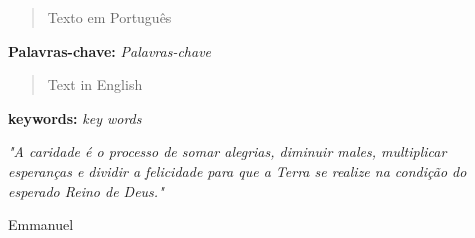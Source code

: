 \documentclass[a4paper, 12pt]{article}
\begin{document}
\graphicspath{{imagens/}{referencias/}{logo/}}  %


\begin{titlepage}

\begin{abstract}
Texto em Português
\end{abstract}
\begin{footnotesize}
\textbf{Palavras-chave:} \textit{Palavras-chave}
\end{footnotesize}
\newpage

\end{titlepage}

\begin{titlepage}

\begin{abstract}
 Text in English
\end{abstract}
\begin{footnotesize}
\textbf{keywords:} \textit{key words}
\end{footnotesize}
\newpage



\end{titlepage}

\begin{titlepage}

   \epigraph{\textit{"A caridade é o processo de somar alegrias, diminuir males, multiplicar esperanças e dividir a felicidade para que a Terra se realize na condição do esperado Reino de Deus."}}{Emmanuel} \newpage

\end{titlepage}
\newpage



\tableofcontents \newpage  %


\listoffigures
\newpage

\end{document}
